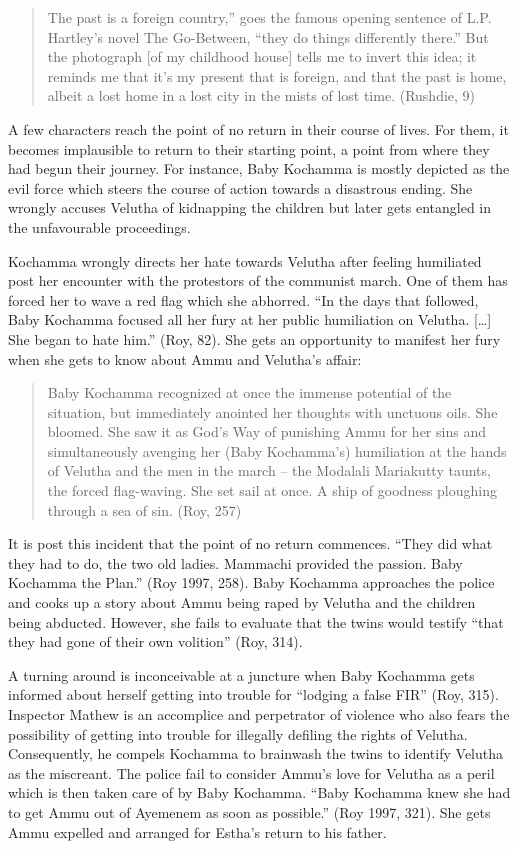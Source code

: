 \begin{quote}
  The past is a foreign country,” goes the famous opening sentence of L.P. Hartley’s novel The Go-Between, “they do things differently there.” But the photograph [of my childhood house] tells me to invert this idea; it reminds me that it’s my present that is foreign, and that the past is home, albeit a lost home in a lost city in the mists of lost time. (Rushdie, 9) 
\end{quote}

A few characters reach the point of no return in their course of lives.  For them, it becomes implausible to return to their starting point, a point from where they had begun their journey. For instance, Baby Kochamma is mostly depicted as the evil force which steers the course of action towards a disastrous ending. She wrongly accuses Velutha of kidnapping the children but later gets entangled in the unfavourable proceedings. 

Kochamma wrongly directs her hate towards Velutha after feeling humiliated post her encounter with the protestors of the communist march. One of them has forced her to wave a red flag which she abhorred. “In the days that followed, Baby Kochamma focused all her fury at her public humiliation on Velutha. […] She began to hate him.” (Roy, 82).
She gets an opportunity to manifest her fury when she gets to know about Ammu and Velutha’s affair:

\begin{quote}
  Baby Kochamma recognized at once the immense potential of the situation, but immediately anointed her thoughts with unctuous oils. She bloomed. She saw it as God’s Way of punishing Ammu for her sins and simultaneously avenging her (Baby Kochamma’s) humiliation at the hands of Velutha and the men in the march – the Modalali Mariakutty taunts, the forced flag-waving. She set sail at once. A ship of goodness ploughing through a sea of sin. (Roy, 257)
\end{quote}

It is post this incident that the point of no return commences. “They did what they had to do, the two old ladies. Mammachi provided the passion. Baby Kochamma the Plan.” (Roy 1997, 258). Baby Kochamma approaches the police and cooks up a story about Ammu being raped by Velutha and the children being abducted. However, she fails to evaluate that the twins would testify “that they had gone of their own volition” (Roy, 314). 

A turning around is inconceivable at a juncture when Baby Kochamma gets informed about herself getting into trouble for “lodging a false FIR” (Roy, 315). Inspector Mathew is an accomplice and perpetrator of violence who also fears the possibility of getting into trouble for illegally defiling the rights of Velutha. Consequently, he compels Kochamma to brainwash the twins to identify Velutha as the miscreant. The police fail to consider Ammu’s love for Velutha as a peril which is then taken care of by Baby Kochamma. “Baby Kochamma knew she had to get Ammu out of Ayemenem as soon as possible.” (Roy 1997, 321). She gets Ammu expelled and arranged for Estha’s return to his father.

